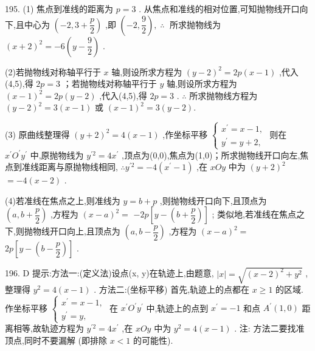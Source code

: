 195. (1) 焦点到准线的距离为 $p = 3$ . 从焦点和准线的相对位置,可知抛物线开口向下,且中心为 $\left( {-2,3 + \dfrac{p}{2}}\right)$ ,即 $\left( {-2,\dfrac{9}{2}}\right) ,\;\therefore \;$ 所求抛物线为 ${\left( x + 2\right) }^{2} =  - 6\left( {y - \dfrac{9}{2}}\right)$ .

(2)若抛物线对称轴平行于 $x$ 轴,则设所求方程为 ${\left( y - 2\right) }^{2} = {2p}\left( {x - 1}\right)$ ,代入(4,5),得 ${2p} = 3$ ；若抛物线对称轴平行于 $y$ 轴,则设所求方程为 ${\left( x - 1\right) }^{2} = {2p}\left( {y - 2}\right)$ ,代入(4,5),得 ${2p} = 3$ . $\therefore$ 所求抛物线方程为 ${\left( y - 2\right) }^{2} = 3\left( {x - 1}\right)$ 或 ${\left( x - 1\right) }^{2} = 3\left( {y - 2}\right) .$

(3) 原曲线整理得 ${\left( y + 2\right) }^{2} = 4\left( {x - 1}\right)$ ,作坐标平移 $\left\{  \begin{array}{l} {x}^{\prime } = x - 1, \\  {y}^{\prime } = y + 2, \end{array}\right.$ 则在 ${x}^{\prime }{O}^{\prime }{y}^{\prime }$ 中,原抛物线为 ${y}^{\prime 2} = 4{x}^{\prime }$ ,顶点为(0,0),焦点为(1,0)；所求抛物线开口向左,焦点到准线距离与原抛物线相同, $\therefore {y}^{\prime 2} =  - 4\left( {{x}^{\prime } - 1}\right)$ ,在 ${xOy}$ 中为 ${\left( y + 2\right) }^{2}$  $=  - 4\left( {x - 2}\right)$ .

(4)若准线在焦点之上,则准线为 $y = b + p$ ,则抛物线开口向下,且顶点为 $\left( {a,b + \dfrac{p}{2}}\right)$ ,方程为 ${\left( x - a\right) }^{2} =$  $- {2p}\left\lbrack  {y - \left( {b + \dfrac{p}{2}}\right) }\right\rbrack$ ; 类似地,若准线在焦点之下,则抛物线开口向上,且顶点为 $\left( {a,b - \dfrac{p}{2}}\right)$ ,方程为 ${\left( x - a\right) }^{2} =$  ${2p}\left\lbrack  {y - \left( {b - \dfrac{p}{2}}\right) }\right\rbrack$ .

196. D 提示:方法一:(定义法)设点(x, y)在轨迹上,由题意, $\left| x\right|  = \sqrt{{\left( x - 2\right) }^{2} + {y}^{2}}$ ,整理得 ${y}^{2} = 4\left( {x - 1}\right)$ . 方法二:(坐标平移) 首先,轨迹上的点都在 $x \geq  1$ 的区域. 作坐标平移 $\left\{  \begin{array}{l} {x}^{\prime } = x - 1, \\  {y}^{\prime } = y, \end{array}\right.$ 在 ${x}^{\prime }{O}^{\prime }{y}^{\prime }$ 中,轨迹上的点到 ${x}^{\prime } =  - 1$ 和点 ${A}^{\prime }\left( {1,0}\right)$ 距离相等,故轨迹方程为 ${y}^{\prime 2} = 4{x}^{\prime }$ ,在 ${xOy}$ 中为 ${y}^{2} = 4\left( {x - 1}\right)$ . 注: 方法二要找准顶点,同时不要漏解 (即排除 $x < 1$ 的可能性).

